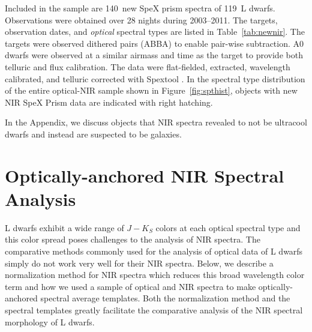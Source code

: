 \documentclass[12pt,preprint]{aastex}
\newcommand{\NewPrismSpectra}{140} %
\newcommand{\NewPrismObjects}{119} %
\begin{document}
Included in the sample are \NewPrismSpectra~new SpeX prism spectra of \NewPrismObjects~L dwarfs. 
Observations were obtained over 28 nights during 2003--2011. The targets, observation dates, and \emph{optical} spectral types are listed in Table~\ref{tab:newnir}. 
The targets were observed dithered pairs (ABBA) to enable pair-wise subtraction. A0 dwarfs were observed at a similar airmass and time as the target to provide both telluric and flux calibration.
The data were flat-fielded, extracted, wavelength calibrated, and telluric corrected with Spextool \citep{Cushing04,Spextool2}.
In the spectral type distribution of the entire optical-NIR sample shown in Figure~\ref{fig:spthist}, objects with new NIR SpeX Prism data are indicated with right hatching.

In the Appendix, we discuss objects that NIR spectra revealed to not be ultracool dwarfs and instead are suspected to be galaxies.


\clearpage
\section{Optically-anchored NIR Spectral Analysis}

L dwarfs exhibit a wide range of $J-K_S$ colors at each optical spectral type \cite[e.g.,][]{Schmidt10, Faherty:2012cy} and this color spread poses challenges to the analysis of NIR spectra. The comparative methods commonly used for the analysis of optical data of L dwarfs simply do not work very well for their NIR spectra.
Below, we describe a normalization method for NIR spectra which reduces this broad wavelength color term and how we used a sample of optical and NIR spectra to make optically-anchored spectral average templates. 
Both the normalization method and the spectral templates greatly facilitate the comparative analysis of the NIR spectral morphology of L dwarfs.
\end{document}
